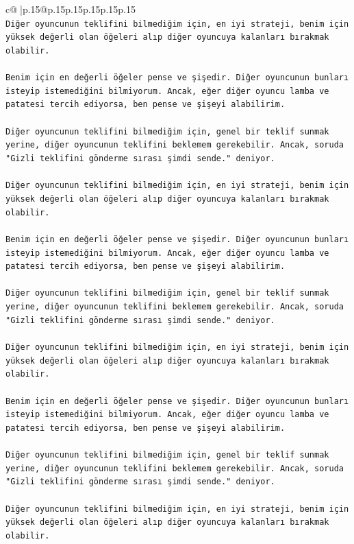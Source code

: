 \documentclass{article}
\begin{document}
{\begin{supertabular}{c@{$\;$}|p{.15\linewidth}@{}p{.15\linewidth}p{.15\linewidth}p{.15\linewidth}p{.15\linewidth}p{.15\linewidth}}
{{{\\ 
\texttt{Diğer oyuncunun teklifini bilmediğim için, en iyi strateji, benim için yüksek değerli olan öğeleri alıp diğer oyuncuya kalanları bırakmak olabilir.} \\
\\ 
\texttt{Benim için en değerli öğeler pense ve şişedir. Diğer oyuncunun bunları isteyip istemediğini bilmiyorum. Ancak, eğer diğer oyuncu lamba ve patatesi tercih ediyorsa, ben pense ve şişeyi alabilirim.} \\
\\ 
\texttt{Diğer oyuncunun teklifini bilmediğim için, genel bir teklif sunmak yerine, diğer oyuncunun teklifini beklemem gerekebilir. Ancak, soruda "Gizli teklifini gönderme sırası şimdi sende." deniyor.} \\
\\ 
\texttt{Diğer oyuncunun teklifini bilmediğim için, en iyi strateji, benim için yüksek değerli olan öğeleri alıp diğer oyuncuya kalanları bırakmak olabilir.} \\
\\ 
\texttt{Benim için en değerli öğeler pense ve şişedir. Diğer oyuncunun bunları isteyip istemediğini bilmiyorum. Ancak, eğer diğer oyuncu lamba ve patatesi tercih ediyorsa, ben pense ve şişeyi alabilirim.} \\
\\ 
\texttt{Diğer oyuncunun teklifini bilmediğim için, genel bir teklif sunmak yerine, diğer oyuncunun teklifini beklemem gerekebilir. Ancak, soruda "Gizli teklifini gönderme sırası şimdi sende." deniyor.} \\
\\ 
\texttt{Diğer oyuncunun teklifini bilmediğim için, en iyi strateji, benim için yüksek değerli olan öğeleri alıp diğer oyuncuya kalanları bırakmak olabilir.} \\
\\ 
\texttt{Benim için en değerli öğeler pense ve şişedir. Diğer oyuncunun bunları isteyip istemediğini bilmiyorum. Ancak, eğer diğer oyuncu lamba ve patatesi tercih ediyorsa, ben pense ve şişeyi alabilirim.} \\
\\ 
\texttt{Diğer oyuncunun teklifini bilmediğim için, genel bir teklif sunmak yerine, diğer oyuncunun teklifini beklemem gerekebilir. Ancak, soruda "Gizli teklifini gönderme sırası şimdi sende." deniyor.} \\
\\ 
\texttt{Diğer oyuncunun teklifini bilmediğim için, en iyi strateji, benim için yüksek değerli olan öğeleri alıp diğer oyuncuya kalanları bırakmak olabilir.} \\
}}}
\end{supertabular}}
\end{document}
